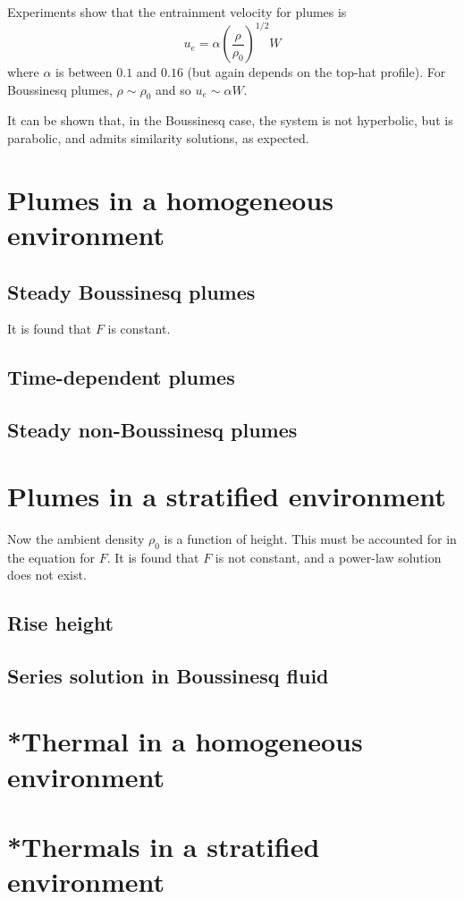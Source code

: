 Experiments show that the entrainment velocity for plumes is 
\begin{equation}
 u_e = \alpha \left(\frac{\rho}{\rho_0}\right)^{1/2} W
\end{equation}
where $\alpha$ is between $0.1$ and $0.16$ (but again depends on the top-hat profile). For Boussinesq plumes, $\rho\sim\rho_0$ and so $u_e \sim \alpha W$. 

It can be shown that, in the Boussinesq case, the system is not hyperbolic, but is parabolic, and admits similarity solutions, as expected. 

\section{Plumes in a homogeneous environment}
\subsection{Steady Boussinesq plumes}

It is found that $F$ is constant. 

\subsection{Time-dependent plumes}
\subsection{Steady non-Boussinesq plumes}

\section{Plumes in a stratified environment}

Now the ambient density $\rho_0$ is a function of height. This must be accounted for in the equation for $F$. It is found that $F$ is not constant, and a power-law solution does not exist.

\subsection{Rise height}
\subsection{Series solution in Boussinesq fluid}

\section{*Thermal in a homogeneous environment}
\section{*Thermals in a stratified environment}
